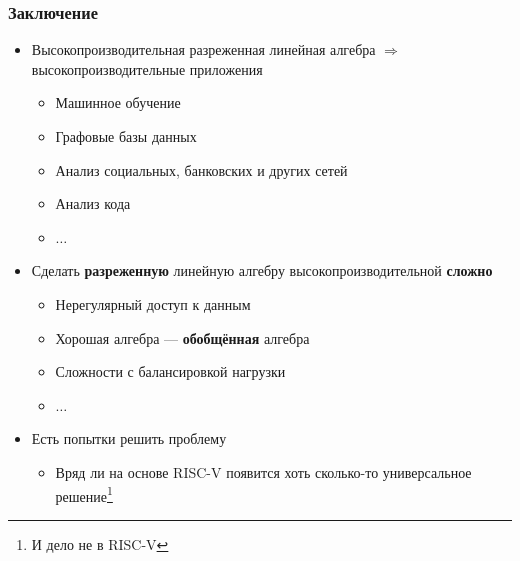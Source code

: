 \documentclass[xcolor=table,aspectratio=169]{beamer}
\begin{document}
\begin{frame}[fragile]
  \frametitle{Заключение}  
  \begin{itemize}
    \item Высокопроизводительная разреженная линейная алгебра $\Rightarrow$ высокопроизводительные приложения
    \begin{itemize}
      \item Машинное обучение
      \item Графовые базы данных
      \item Анализ социальных, банковских и других сетей
      \item Анализ кода
      \item $\ldots$
    \end{itemize}
    \item Сделать \textbf{разреженную} линейную алгебру высокопроизводительной \textbf{сложно}
    \begin{itemize}
      \item Нерегулярный доступ к данным
      \item Хорошая алгебра --- \textbf{обобщённая} алгебра
      \item Сложности с балансировкой нагрузки
      \item $\ldots$
    \end{itemize}
    \item Есть попытки решить проблему
    \begin{itemize}
      \item Вряд ли на основе RISC-V появится хоть сколько-то универсальное решение\footnote{И дело не в RISC-V}
    \end{itemize} 
  \end{itemize}
\end{frame}

\appendix
\end{document}
